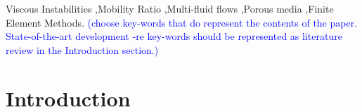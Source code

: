 \documentclass[preprint,authoryear,12pt]{elsarticle}
\newcommand{\blue}{\textcolor{blue}}
\begin{document}
\begin{frontmatter}
\begin{abstract}
\end{abstract} 

\begin{keyword} %
  Viscous Instabilities \sep Mobility Ratio \sep Multi-fluid flows \sep Porous media \sep Finite Element Methods. \blue{(choose key-words that do represent the contents of the paper. State-of-the-art development -re key-words should be represented as literature review in the Introduction section.)}


\end{keyword}

\end{frontmatter}


\clearpage

\section{Introduction}\label{section:Intro}
\end{document}
